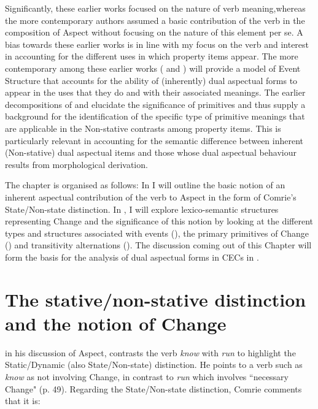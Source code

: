 Significantly, these earlier works focused on the nature of verb
meaning,\linebreak whereas the more contemporary authors assumed a basic
contribution of the verb in the composition of Aspect without focusing
on the nature of this element per se.  A bias towards these
earlier works is in line with my focus on the verb and interest in
accounting for the different uses in which property items appear.  The
more contemporary among these earlier works
(\citealt{Pustejovsky1988,Pustejovsky1991} and \citealt{Grimshaw1990}) will
provide a model of Event Structure that accounts for the ability of
(inherently) dual aspectual forms to appear in the uses that they do
and with their associated meanings.  The earlier decompositions of
\citet{McCawley1968,Carter1976} and \citet{Dowty1979}
elucidate the significance of primitives and thus supply a background
for the identification of the specific type of primitive meanings that
are applicable in the Non-stative contrasts among property items.
This is particularly relevant in accounting for the semantic
difference between inherent (Non-stative) dual aspectual items and
those whose dual aspectual behaviour results from morphological
derivation.

The chapter is organised as follows: In  I will
outline the basic notion of an inherent aspectual contribution of the
verb to Aspect in the form of Comrie’s State\slash Non-state distinction.
In , I will explore lexico-semantic structures
representing Change and the significance of this notion by looking at
the different types and structures associated with events
(), the primary primitives of Change
() and transitivity alternations
().  The discussion coming out of this Chapter will
form the basis for the analysis of dual aspectual forms in CECs in
.

\section{The stative/non-stative distinction and the notion of
  Change}\label{sec:4.1} %

\citet{Comrie1976,} in his discussion of Aspect, contrasts the verb
\textit{know} with \textit{run} to highlight the Static\slash Dynamic (also
State\slash Non-state) distinction. He points to a verb such as \textit{know} as
not involving Change, in contrast to \textit{run} which involves ``necessary
Change" (p. 49).  Regarding the State\slash Non-state distinction, Comrie
comments that it is:

